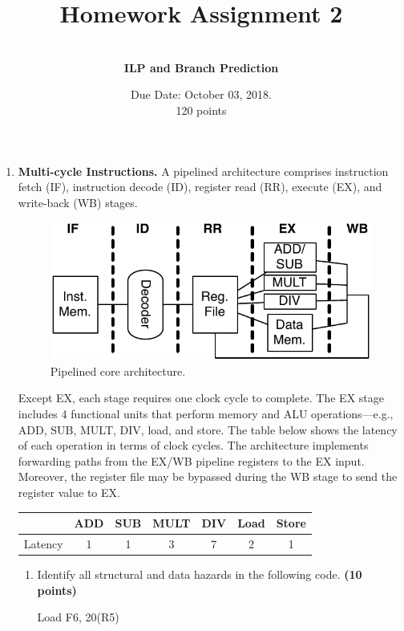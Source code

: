 \documentclass[a4paper, 11pt]{exam}
\title{Homework Assignment 2}
\subtitle{CS/ECE 6810: Computer Architecture \\
September 26,2018
\\
Name: Jake Pitkin

UID: u0891770 }
\author{ \\
\textbf{ILP and Branch Prediction}}
\date{Due Date: October 03, 2018.\\
120 points}
\begin{document}
\maketitle
\begin{center}

\begin{enumerate}

\item \textbf{Multi-cycle Instructions.}
A pipelined architecture comprises instruction fetch (IF), instruction decode (ID), register read (RR), execute (EX), and write-back (WB) stages.
\begin{figure}[!h]
	\centering
	\includegraphics[width=0.5\linewidth]{q1}
	\caption{Pipelined core architecture.}
	\label{fig:q1}
\end{figure}

Except EX, each stage requires one clock cycle to complete.
The EX stage includes 4 functional units that perform memory and ALU operations---e.g., ADD, SUB, MULT, DIV, load, and store.
The table below shows the latency of each operation in terms of clock cycles.
The architecture implements forwarding paths from the EX/WB pipeline registers to the EX input.
Moreover, the register file may be bypassed during the WB stage to send the register value to EX.

\begin{center}
\begin{tabular}{ |c|c|c|c|c|c|c| } 
 \hline
  & ADD & SUB & MULT & DIV & Load & Store \\ 
  \hline
 Latency & 1 & 1 & 3 & 7 & 2 & 1 \\ 
 \hline
\end{tabular}
\end{center}

\begin{enumerate}



\item Identify all structural and data hazards in the following code. \textbf {(10 points)}


\begin {center}
Load F6, 20(R5) 


\end{center}
\end{enumerate}
\end{enumerate}
\end{center}
\end{document}
